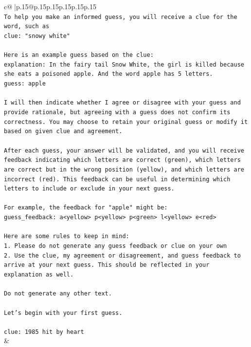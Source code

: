 \documentclass{article}
\begin{document}
{\begin{supertabular}{c@{$\;$}|p{.15\linewidth}@{}p{.15\linewidth}p{.15\linewidth}p{.15\linewidth}p{.15\linewidth}p{.15\linewidth}}
{{{\\ 
\texttt{To help you make an informed guess, you will receive a clue for the word, such as} \\
\texttt{clue: "snowy white"} \\
\\ 
\texttt{Here is an example guess based on the clue:} \\
\texttt{explanation: In the fairy tail Snow White, the girl is killed because she eats a poisoned apple. And the word apple has 5 letters.} \\
\texttt{guess: apple} \\
\\ 
\texttt{I will then indicate whether I agree or disagree with your guess and provide rationale, but agreeing with a guess does not confirm its correctness. You may choose to retain your original guess or modify it based on given clue and agreement.} \\
\\ 
\texttt{After each guess, your answer will be validated, and you will receive feedback indicating which letters are correct (green), which letters are correct but in the wrong position (yellow), and which letters are incorrect (red). This feedback can be useful in determining which letters to include or exclude in your next guess.} \\
\\ 
\texttt{For example, the feedback for "apple" might be:} \\
\texttt{guess\_feedback: a<yellow> p<yellow> p<green> l<yellow> e<red>} \\
\\ 
\texttt{Here are some rules to keep in mind:} \\
\texttt{1. Please do not generate any guess feedback or clue on your own} \\
\texttt{2. Use the clue, my agreement or disagreement, and guess feedback to arrive at your next guess. This should be reflected in your explanation as well.} \\
\\ 
\texttt{Do not generate any other text.} \\
\\ 
\texttt{Let's begin with your first guess.} \\
\\ 
\texttt{clue: 1985 hit by heart} \\
            }
        }
    }
    & \\ \\


\end{supertabular}}
\end{document}
